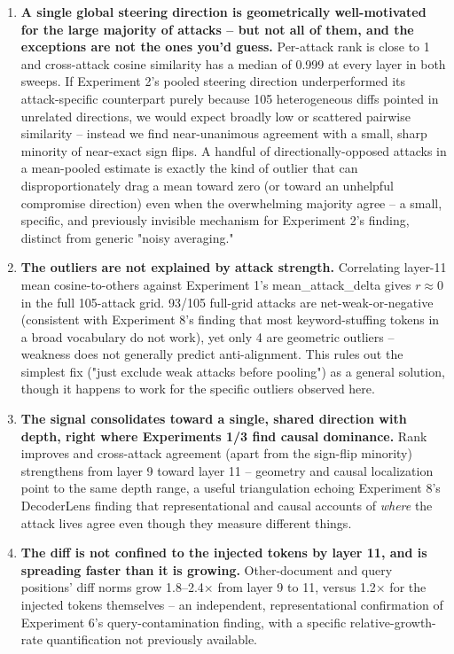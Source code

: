 \documentclass[11pt]{article}
\begin{document}
\begin{enumerate}
  \item \textbf{A single global steering direction is geometrically
  well-motivated for the large majority of attacks -- but not all of
  them, and the exceptions are not the ones you'd guess.} Per-attack rank
  is close to 1 and cross-attack cosine similarity has a median of 0.999
  at every layer in both sweeps. If Experiment 2's pooled steering
  direction underperformed its attack-specific counterpart purely because
  105 heterogeneous diffs pointed in unrelated directions, we would expect
  broadly low or scattered pairwise similarity -- instead we find near-unanimous
  agreement with a small, sharp minority of near-exact sign flips. A
  handful of directionally-opposed attacks in a mean-pooled estimate is
  exactly the kind of outlier that can disproportionately drag a mean
  toward zero (or toward an unhelpful compromise direction) even when the
  overwhelming majority agree -- a small, specific, and previously
  invisible mechanism for Experiment 2's finding, distinct from generic
  "noisy averaging."
  \item \textbf{The outliers are not explained by attack strength.}
  Correlating layer-11 mean cosine-to-others against Experiment 1's
  mean\_attack\_delta gives $r \approx 0$ in the full 105-attack grid.
  93/105 full-grid attacks are net-weak-or-negative (consistent with
  Experiment 8's finding that most keyword-stuffing tokens in a broad
  vocabulary do not work), yet only 4 are geometric outliers -- weakness
  does not generally predict anti-alignment. This rules out the simplest
  fix ("just exclude weak attacks before pooling") as a general solution,
  though it happens to work for the specific outliers observed here.
  \item \textbf{The signal consolidates toward a single, shared direction
  with depth, right where Experiments 1/3 find causal dominance.} Rank
  improves and cross-attack agreement (apart from the sign-flip minority)
  strengthens from layer 9 toward layer 11 -- geometry and causal
  localization point to the same depth range, a useful triangulation
  echoing Experiment 8's DecoderLens finding that representational and
  causal accounts of \emph{where} the attack lives agree even though they
  measure different things.
  \item \textbf{The diff is not confined to the injected tokens by layer
  11, and is spreading faster than it is growing.} Other-document and
  query positions' diff norms grow 1.8--2.4$\times$ from layer 9 to 11,
  versus 1.2$\times$ for the injected tokens themselves -- an independent,
  representational confirmation of Experiment 6's query-contamination
  finding, with a specific relative-growth-rate quantification not
  previously available.
\end{enumerate}
\end{document}
